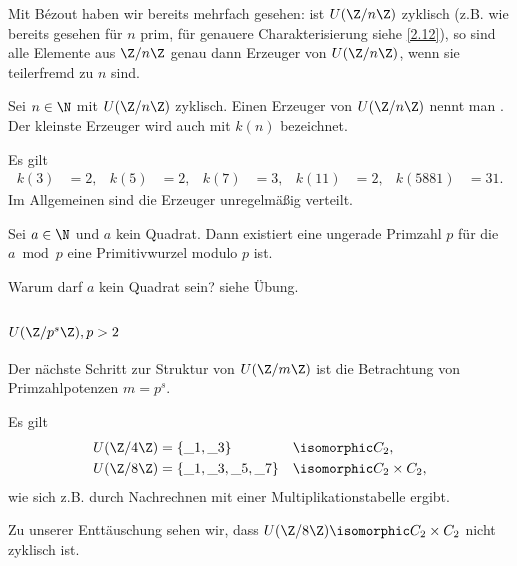 Mit Bézout haben wir bereits mehrfach gesehen: ist $U(\Z / n \Z)$ zyklisch (z.B. wie bereits gesehen für $n$ prim, für genauere Charakterisierung siehe \ref{2.12}), so sind alle Elemente aus $\Z / n \Z$ genau dann Erzeuger von $U(\Z / n \Z)$, wenn sie teilerfremd zu $n$ sind.

\begin{df*}
	Sei $n \in \N$ mit $U(\Z / n \Z)$ zyklisch.
	Einen Erzeuger von $U(\Z / n \Z)$ nennt man .
	Der kleinste Erzeuger wird auch mit $k(n)$ bezeichnet.
\end{df*}

\begin{ex*}
	Es gilt
	\begin{align*}
		k(3) &= 2, &
		k(5) &= 2, &
		k(7) &= 3, &
		k(11) &= 2, &
		k(5881) &= 31.
	\end{align*}
	Im Allgemeinen sind die Erzeuger unregelmäßig verteilt.
\end{ex*}

\begin{conj*}[E. Artin]
	Sei $a \in \N$ und $a$ kein Quadrat.
	Dann existiert eine ungerade Primzahl $p$ für die $a \bmod p$ eine Primitivwurzel modulo $p$ ist.
	\begin{note}
		Warum darf $a$ kein Quadrat sein?
		siehe Übung.
	\end{note}
\end{conj*}

\subsection{\texorpdfstring{$U(\Z / p^s \Z), p > 2$}{U(ℤ/p\textasciicircum sℤ), p>2}}

Der nächste Schritt zur Struktur von $U(\Z / m \Z)$ ist die Betrachtung von Primzahlpotenzen $m = p^s$.

\begin{ex*}
	Es gilt
	\begin{alignat*}{3}
		U(\Z / 4 \Z) &= \{ \_ 1, \_ 3 \}& & \isomorphic C_2, \\
		U(\Z / 8 \Z) &= \{ \_ 1, \_ 3, \_ 5, \_ 7 \}& & \isomorphic C_2 \times C_2,
	\end{alignat*}
	wie sich z.B. durch Nachrechnen mit einer Multiplikationstabelle ergibt.

	Zu unserer Enttäuschung sehen wir, dass $U(\Z / 8 \Z) \isomorphic C_2 \times C_2$ nicht zyklisch ist.
\end{ex*}


